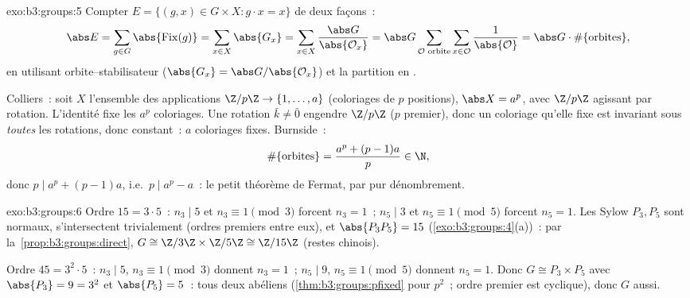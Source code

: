 \begin{solution}{exo:b3:groups:5}
Compter $E = \{(g,x) \in G \times X : g \cdot x = x\}$ de deux
façons~:
\[
\abs E = \sum_{g \in G} \abs{\operatorname{Fix}(g)}
= \sum_{x \in X} \abs{G_x}
= \sum_{x \in X} \frac{\abs G}{\abs{\mathcal O_x}}
= \abs G \sum_{\mathcal O \text{ orbite}} \sum_{x \in \mathcal O}
\frac{1}{\abs{\mathcal O}}
= \abs G \cdot \#\{\text{orbites}\},
\]
en utilisant orbite--stabilisateur ($\abs{G_x} = \abs
G/\abs{\mathcal O_x}$) et la partition en .

Colliers~: soit $X$ l'ensemble des applications $\Z/p\Z \to
\{1, \dots, a\}$ (coloriages de $p$ positions), $\abs X = a^p$,
avec $\Z/p\Z$ agissant par rotation. L'identité fixe les $a^p$
coloriages. Une rotation $\bar k \neq \bar 0$ engendre $\Z/p\Z$
($p$ premier), donc un coloriage qu'elle fixe est invariant sous
\emph{toutes} les rotations, donc constant~: $a$ coloriages
fixes. Burnside~:
\[
\#\{\text{orbites}\} = \frac{a^p + (p-1)a}{p} \in \N ,
\]
donc $p \mid a^p + (p-1)a$, i.e.\ $p \mid a^p - a$~: le petit
théorème de Fermat, par pur dénombrement.
\end{solution}

\begin{solution}{exo:b3:groups:6}
Ordre $15 = 3 \cdot 5$~: $n_3 \mid 5$ et $n_3 \equiv 1 \pmod 3$
forcent $n_3 = 1$~; $n_5 \mid 3$ et $n_5 \equiv 1 \pmod 5$
forcent $n_5 = 1$. Les Sylow $P_3, P_5$ sont normaux,
s'intersectent trivialement (ordres premiers entre eux), et
$\abs{P_3P_5} = 15$ (\cref{exo:b3:groups:4}(a))~: par
la~\cref{prop:b3:groups:direct}, $G \cong \Z/3\Z \times \Z/5\Z
\cong \Z/15\Z$ (restes chinois).

Ordre $45 = 3^2 \cdot 5$~: $n_3 \mid 5$, $n_3 \equiv 1 \pmod 3$
donnent $n_3 = 1$~; $n_5 \mid 9$, $n_5 \equiv 1 \pmod 5$ donnent
$n_5 = 1$. Donc $G \cong P_3 \times P_5$ avec $\abs{P_3} = 9 =
3^2$ et $\abs{P_5} = 5$~: tous deux abéliens
(\cref{thm:b3:groups:pfixed} pour $p^2$~; ordre premier est
cyclique), donc $G$ aussi.
\end{solution}

